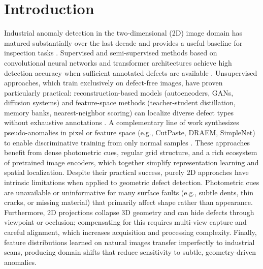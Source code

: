 \section{Introduction}

Industrial anomaly detection in the two-dimensional (2D) image domain has matured substantially over the last decade and provides a useful baseline for inspection tasks \cite{samrouth2025dual, casas2024comparative, liu2025improved}. Supervised and semi-supervised methods based on convolutional neural networks and transformer architectures achieve high detection accuracy when sufficient annotated defects are available \cite{venkataramanan2020attention,ding2022catching}. Unsupervised approaches, which train exclusively on defect-free images, have proven particularly practical: reconstruction-based models (autoencoders, GANs, diffusion systems) and feature-space methods (teacher-student distillation, memory banks, nearest-neighbor scoring) can localize diverse defect types without exhaustive annotations \cite{shi2021dfr,hou2021divide,zavrtanik2021draem,zavrtanik2022dsr,de2022masked,yao2023focus,defard2021padim,bergmann2020uninformed}. A complementary line of work synthesizes pseudo-anomalies in pixel or feature space (e.g., CutPaste, DRAEM, SimpleNet) to enable discriminative training from only normal samples \cite{li2021cutpaste,zavrtanik2021draem,liu2023simplenet}. These approaches benefit from dense photometric cues, regular grid structure, and a rich ecosystem of pretrained image encoders, which together simplify representation learning and spatial localization. Despite their practical success, purely 2D approaches have intrinsic limitations when applied to geometric defect detection. Photometric cues are unavailable or uninformative for many surface faults (e.g., subtle dents, thin cracks, or missing material) that primarily affect shape rather than appearance. Furthermore, 2D projections collapse 3D geometry and can hide defects through viewpoint or occlusion; compensating for this requires multi-view capture and careful alignment, which increases acquisition and processing complexity. Finally, feature distributions learned on natural images transfer imperfectly to industrial scans, producing domain shifts that reduce sensitivity to subtle, geometry-driven anomalies.

